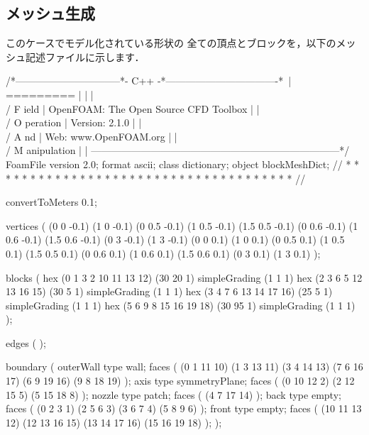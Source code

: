 \subsection{メッシュ生成}
\label{ssec:3.4.2}
このケースでモデル化されている形状の
全ての頂点とブロックを，以下のメッシュ記述ファイルに示します．
\begin{OFverbatim}
/*--------------------------------*- C++ -*----------------------------------*\
| =========                 |                                                 |
| \\      /  F ield         | OpenFOAM: The Open Source CFD Toolbox           |
|  \\    /   O peration     | Version:  2.1.0                                 |
|   \\  /    A nd           | Web:      www.OpenFOAM.org                      |
|    \\/     M anipulation  |                                                 |
\*---------------------------------------------------------------------------*/
FoamFile
{
    version     2.0;
    format      ascii;
    class       dictionary;
    object      blockMeshDict;
}
// * * * * * * * * * * * * * * * * * * * * * * * * * * * * * * * * * * * * * //

convertToMeters 0.1;

vertices        
(
    (0 0 -0.1)
    (1 0 -0.1)
    (0 0.5 -0.1)
    (1 0.5 -0.1)
    (1.5 0.5 -0.1)
    (0 0.6 -0.1)
    (1 0.6 -0.1)
    (1.5 0.6 -0.1)
    (0 3 -0.1)
    (1 3 -0.1)
    (0 0 0.1)
    (1 0 0.1)
    (0 0.5 0.1)
    (1 0.5 0.1)
    (1.5 0.5 0.1)
    (0 0.6 0.1)
    (1 0.6 0.1)
    (1.5 0.6 0.1)
    (0 3 0.1)
    (1 3 0.1)
);

blocks          
(
    hex (0 1 3 2 10 11 13 12) (30 20 1) simpleGrading (1 1 1)
    hex (2 3 6 5 12 13 16 15) (30 5 1) simpleGrading (1 1 1)
    hex (3 4 7 6 13 14 17 16) (25 5 1) simpleGrading (1 1 1)
    hex (5 6 9 8 15 16 19 18) (30 95 1) simpleGrading (1 1 1)
);

edges           
(
);

boundary
(
    outerWall
    {
        type wall;
        faces
        (
            (0 1 11 10)
            (1 3 13 11)
            (3 4 14 13)
            (7 6 16 17)
            (6 9 19 16)
            (9 8 18 19)
        );
    }
    axis
    {
        type symmetryPlane;
        faces
        (
            (0 10 12 2)
            (2 12 15 5)
            (5 15 18 8)
        );
    }
    nozzle
    {
        type patch;
        faces
        (
            (4 7 17 14)
        );
    }
    back
    {
        type empty;
        faces
        (
            (0 2 3 1)
            (2 5 6 3)
            (3 6 7 4)
            (5 8 9 6)
        );
    }
    front
    {
        type empty;
        faces
        (
            (10 11 13 12)
            (12 13 16 15)
            (13 14 17 16)
            (15 16 19 18)
        );
    }
);


\end{OFverbatim}
